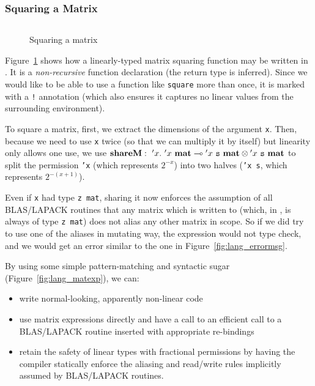 \subsubsection{Squaring a Matrix}

\begin{figure}[t]
    \centering
    \inputminted[fontsize=\small]{ocaml}{../../examples/square.lt}
    \caption{Squaring a matrix}\label{fig:lang_square}
\end{figure}

Figure~\ref{fig:lang_square} shows how a linearly-typed matrix squaring
function may be written in \lang. It is a \emph{non-recursive} function
declaration (the return type is inferred). Since we would like to be able to
use a function like \texttt{square} more than once, it is marked with a
\texttt{!} annotation (which also ensures it captures no linear values from the
surrounding environment).

To square a matrix, first, we extract the dimensions of the argument
\texttt{x}. Then, because we need to use \texttt{x} twice (so that we can
multiply it by itself) but linearity only allows one use, we use
$\mathbf{shareM}:\ {'x}.\ {{'x}\ \mathbf{mat}} \multimap {{'x}\ \texttt{s}\ \mathbf{mat}} \otimes
{{'x}\ \texttt{s}\ \mathbf{mat}}$ to split the permission \texttt{'x} (which represents
$2^{-x}$) into two halves (\texttt{'x s}, which represents $2^{-(x+1)}$).

Even if \texttt{x} had type \texttt{z mat}, sharing it now enforces the
assumption of all BLAS/LAPACK routines that any matrix which is written to
(which, in \lang, is always of type \texttt{z mat}) does not alias any other
matrix in scope. So if we did try to use one of the aliases in mutating way,
the expression would not type check, and we would get an error similar to the
one in Figure~\ref{fig:lang_errormsg}.

By using some simple pattern-matching and syntactic sugar
(Figure~\ref{fig:lang_matexp}), we can:
\begin{itemize}
    \item write normal-looking, apparently non-linear code
    \item use matrix expressions directly and have a call to an efficient
        call to a BLAS/LAPACK routine inserted with appropriate re-bindings
    \item retain the safety of linear types with fractional permissions by
        having the compiler statically enforce the aliasing and read/write rules
        implicitly assumed by BLAS/LAPACK routines.
\end{itemize}

